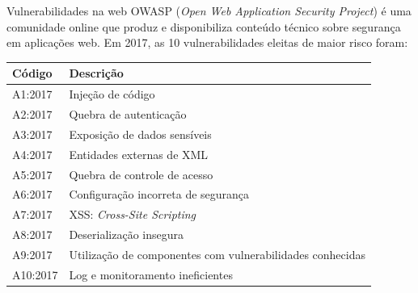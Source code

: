 \documentclass[utf8]{beamer}
\begin{document}
\begin{frame}{Vulnerabilidades na web}
  OWASP (\emph{Open Web Application Security Project})
  é uma comunidade online que produz e disponibiliza
  conteúdo técnico sobre segurança em aplicações web.
  \vfill
  Em 2017, as 10 vulnerabilidades eleitas de maior risco foram:
  \vfill
  \begin{tabu}{lX}
    \hline
    Código   & Descrição \\
    \hline
    A1:2017  & Injeção de código \\
    A2:2017  & Quebra de autenticação \\
    A3:2017  & Exposição de dados sensíveis \\
    A4:2017  & Entidades externas de XML \\
    A5:2017  & Quebra de controle de acesso \\
    A6:2017  & Configuração incorreta de segurança \\
    A7:2017  & XSS: \emph{Cross-Site Scripting} \\
    A8:2017  & Deserialização insegura \\
    A9:2017  & Utilização de componentes
               com vulnerabilidades conhecidas \\
    A10:2017 & Log e monitoramento ineficientes \\
    \hline
  \end{tabu}
\end{frame}
\end{document}

